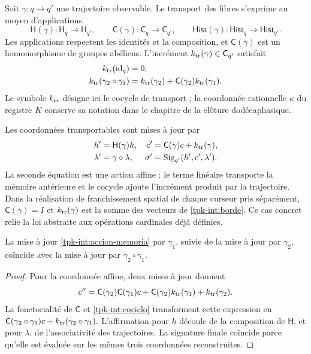 Soit \(\gamma:q\to q'\) une trajectoire observable. Le transport
des fibres s'exprime au moyen d'applications
\[
 \mathsf H(\gamma):\mathsf H_q\to\mathsf H_{q'},\qquad
 \mathsf C(\gamma):\mathsf C_q\to\mathsf C_{q'},\qquad
 \mathsf{Hist}(\gamma):\mathsf{Hist}_q\to\mathsf{Hist}_{q'}.
\]
Les applications respectent les identités et la composition, et
\(\mathsf C(\gamma)\) est un homomorphisme de groupes abéliens.
L'incrément \(k_{\rm tr}(\gamma)\in\mathsf C_{q'}\) satisfait
\begin{equation}
 \begin{split}
 k_{\rm tr}(\operatorname{id}_q)&=0,\\
 k_{\rm tr}(\gamma_2\circ\gamma_1)
 &=k_{\rm tr}(\gamma_2)+
   \mathsf C(\gamma_2)k_{\rm tr}(\gamma_1).
 \end{split}
 \label{tpk-int:cociclo}
\end{equation}
Le symbole \(k_{\rm tr}\) désigne ici le cocycle de transport ;
la coordonnée rationnelle \(\kappa\) du registre \(K\) conserve
sa notation dans le chapitre de la clôture dodécaphasique.

Les coordonnées transportables sont mises à jour par
\begin{equation}
 \begin{aligned}
 h'&=\mathsf H(\gamma)h,&
 c'&=\mathsf C(\gamma)c+k_{\rm tr}(\gamma),\\
 \lambda'&=\gamma\circ\lambda,&
 \sigma'&=\operatorname{Sig}_{q'}(h',c',\lambda').
 \end{aligned}
 \label{tpk-int:accion-memoria}
\end{equation}
La seconde équation est une action affine : le terme linéaire transporte la mémoire antérieure et le cocycle ajoute l'incrément produit par la trajectoire. Dans la réalisation de franchissement spatial de chaque curseur pris séparément, \(\mathsf C(\gamma)=I\) et \(k_{\rm tr}(\gamma)\) est la somme des vecteurs de \eqref{tpk-int:borde}. Ce cas concret relie la loi abstraite aux opérations cardinales déjà définies.

\begin{proposition}
\label{tpk-int:composicion-memoria}
La mise à jour \eqref{tpk-int:accion-memoria} par
\(\gamma_1\), suivie de la mise à jour par \(\gamma_2\),
coïncide avec la mise à jour par \(\gamma_2\circ\gamma_1\).
\end{proposition}
\begin{proof}
Pour la coordonnée affine, deux mises à jour donnent
\[
 c''=\mathsf C(\gamma_2)\mathsf C(\gamma_1)c
       +\mathsf C(\gamma_2)k_{\rm tr}(\gamma_1)
       +k_{\rm tr}(\gamma_2).
\]
La fonctorialité de \(\mathsf C\) et
\eqref{tpk-int:cociclo} transforment cette expression en
\(\mathsf C(\gamma_2\circ\gamma_1)c+
k_{\rm tr}(\gamma_2\circ\gamma_1)\).
L'affirmation pour \(h\) découle de la composition de
\(\mathsf H\), et pour \(\lambda\), de l'associativité des
trajectoires. La signature finale coïncide parce qu'elle est évaluée sur les mêmes
trois coordonnées reconstruites.
\end{proof}

